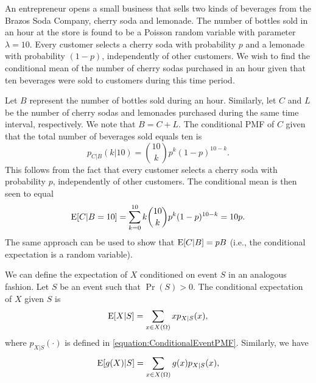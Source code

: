 \begin{example}
An entrepreneur opens a small business that sells two kinds of beverages from the Brazos Soda Company, cherry soda and lemonade.
The number of bottles sold in an hour at the store is found to be a Poisson random variable with parameter $\lambda = 10$.
Every customer selects a cherry soda with probability $p$ and a lemonade with probability $(1 - p)$, independently of other customers.
We wish to find the conditional mean of the number of cherry sodas purchased in an hour given that ten beverages were sold to customers during this time period.

Let $B$ represent the number of bottles sold during an hour.
Similarly, let $C$ and $L$ be the number of cherry sodas and lemonades purchased during the same time interval, respectively.
We note that $B = C + L$.
The conditional PMF of $C$ given that the total number of beverages sold equals ten is
\begin{equation} \label{equation:ConditionalPoisson}
p_{C|B} (k | 10)
= \binom{10}{k} p^k (1-p)^{10-k} .
\end{equation}
This follows from the fact that every customer selects a cherry soda with probability $p$, independently of other customers.
The conditional mean is then seen to equal
\begin{equation*}
\mathrm{E} [ C | B=10] = \sum_{k=0}^{10}
k \binom{10}{k} p^k (1-p)^{10-k} = 10 p .
\end{equation*}
The same approach can be used to show that $\mathrm{E} [ C | B ] = p B$ (i.e., the conditional expectation is a random variable).
\end{example}

We can define the expectation of $X$ conditioned on event $S$ in an analogous fashion.
Let $S$ be an event such that $\Pr (S) > 0$.
The conditional expectation of $X$ given $S$ is
\begin{equation*}
\mathrm{E} [X | S] = \sum_{x \in X(\Omega)} x p_{X|S} (x) ,
\end{equation*}
where $p_{X|S} (\cdot)$ is defined in \eqref{equation:ConditionalEventPMF}.
Similarly, we have
\begin{equation*}
\mathrm{E} [g(X) | S] = \sum_{x \in X(\Omega)} g(x) p_{X|S} (x) ,
\end{equation*}

